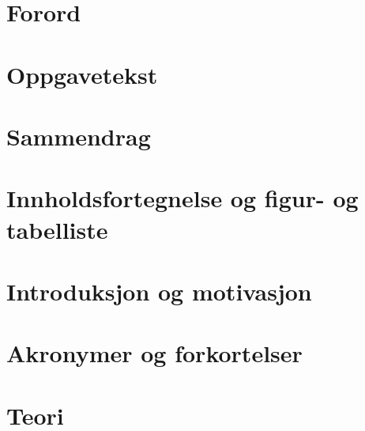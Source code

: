 \documentclass{article}
\begin{document}

\newpage


\section{Forord} %
\label{sec:forord}

\newpage


\section{Oppgavetekst} %
\label{sec:oppgavetekst}

\newpage


\section{Sammendrag} %
\label{sec:sammendrag}

\newpage


\section{Innholdsfortegnelse og figur- og tabelliste} %
\label{sec:innholdsfortegnelse_og_figur_og_tabelliste}
\tableofcontents
\newpage


\section{Introduksjon og motivasjon} %
\label{sec:introduksjon_og_motivasjon}



\newpage


\section{Akronymer og forkortelser} %
\label{sec:akronymer_og_forkortelser}

\newpage


\section{Teori} %
\label{sec:teori}

\newpage
\end{document}
